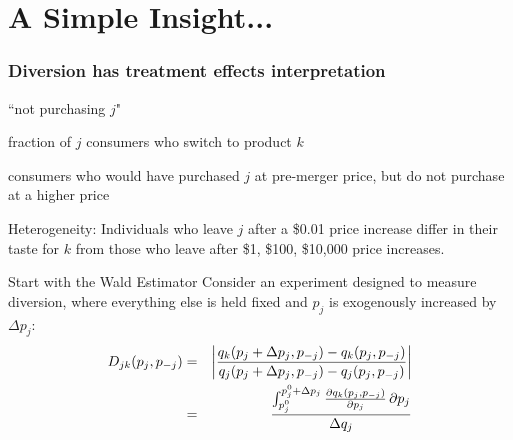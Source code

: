 \documentclass[xcolor=pdftex,dvipsnames,table,mathserif,aspectratio=169]{beamer}
\begin{document}
\section*{A Simple Insight...}

\begin{frame}
\frametitle{Diversion has treatment effects interpretation}
\begin{description}[labelwidth=\widthof{\bfseries Treated group}]
\item[Treatment] ``not purchasing $j$"
\item[Outcome] fraction of $j$ consumers who switch to product $k$
\item[Treated group] consumers who would have purchased $j$ at pre-merger price, but do not purchase at a higher price
\end{description}

Heterogeneity: Individuals who leave $j$ after a \$0.01 price increase differ in their taste for $k$ from those who leave after \$1, \$100, \$10,000 price increases.
\end{frame}



\begin{frame}{Start with the Wald Estimator}
Consider an experiment designed to measure diversion, where everything else is held fixed and $p_j$ is exogenously increased by $\Delta p_j$:
\begin{eqnarray*}
\small
D_{jk}(p_j,p_{-j}) &=&  \left| \frac{q_{k}(p_j+\Delta p_j,p_{-j}) - q_{k}(p_j,p_{-j})}{q_{j}(p_j+\Delta p_j,p_{-j}) - q_{j}(p_j,p_{-j})}   \right|  \\
&=& 
 \frac{\int_{p_j^{0}}^{p_j^0+\Delta p_j}  \frac{\partial q_k(p_j,p_{-j})}{\partial p_j}\,\partial p_j }{\Delta q_j}
\end{eqnarray*}
\end{frame}
\end{document}
